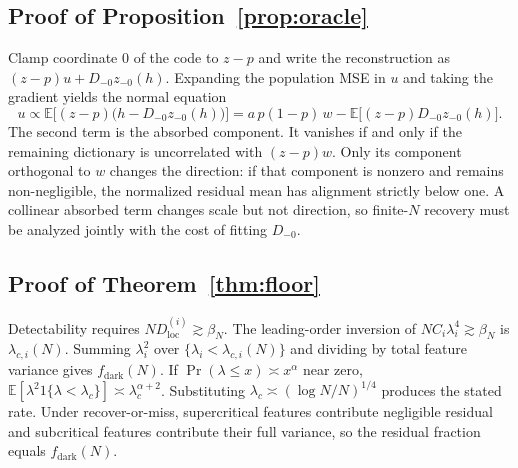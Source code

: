 \documentclass{article}
\theoremstyle{plain}
\begin{document}
{\subsection{Proof of Proposition~\ref{prop:oracle}}
Clamp coordinate $0$ of the code to $z-p$ and write the reconstruction as $(z-p)u+D_{-0}z_{-0}(h)$. Expanding the population MSE in $u$ and taking the gradient yields the normal equation
\[
u\propto\mathbb{E}\bigl[(z-p)\bigl(h-D_{-0}z_{-0}(h)\bigr)\bigr]=a\,p(1-p)\,w-\mathbb{E}\bigl[(z-p)D_{-0}z_{-0}(h)\bigr].
\]
The second term is the absorbed component. It vanishes if and only if the remaining dictionary is uncorrelated with $(z-p)w$. Only its component orthogonal to $w$ changes the direction: if that component is nonzero and remains non-negligible, the normalized residual mean has alignment strictly below one. A collinear absorbed term changes scale but not direction, so finite-$N$ recovery must be analyzed jointly with the cost of fitting $D_{-0}$.

\subsection{Proof of Theorem~\ref{thm:floor}}
Detectability requires $N D_{\mathrm{loc}}^{(i)}\gtrsim\beta_N$. The leading-order inversion of $N C_i\lambda_i^4\gtrsim\beta_N$ is $\lambda_{c,i}(N)$. Summing $\lambda_i^2$ over $\{\lambda_i<\lambda_{c,i}(N)\}$ and dividing by total feature variance gives $f_{\mathrm{dark}}(N)$. If $\Pr(\lambda\le x)\asymp x^{\alpha}$ near zero, $\mathbb{E}[\lambda^2 1\{\lambda<\lambda_c\}]\asymp\lambda_c^{\alpha+2}$. Substituting $\lambda_c\asymp(\log N/N)^{1/4}$ produces the stated rate. Under recover-or-miss, supercritical features contribute negligible residual and subcritical features contribute their full variance, so the residual fraction equals $f_{\mathrm{dark}}(N)$.


}
\end{document}
